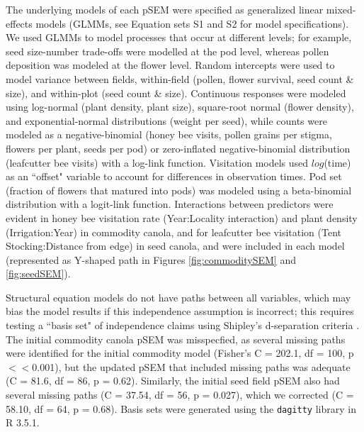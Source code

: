 \documentclass[12pt]{article} %
\begin{document}
The underlying models of each pSEM were specified as generalized linear mixed-effects models (GLMMs, see Equation sets S1 and S2 for model specifications).
We used GLMMs to model processes that occur at different levels; for example, seed size-number trade-offs were modelled at the pod level, whereas pollen deposition was modeled at the flower level.
Random intercepts were used to model variance between fields, within-field (pollen, flower survival, seed count \& size), and within-plot (seed count \& size).
Continuous responses were modeled using log-normal (plant density, plant size), square-root normal (flower density), and exponential-normal distributions (weight per seed), while counts were modeled as a negative-binomial (honey bee visits, pollen grains per stigma, flowers per plant, seeds per pod) or zero-inflated negative-binomial distribution (leafcutter bee visits) with a log-link function.
Visitation models used $log$(time) as an ``offset" variable to account for differences in observation times.
Pod set (fraction of flowers that matured into pods) was modeled using a beta-binomial distribution with a logit-link function.
Interactions between predictors were evident in honey bee visitation rate (Year:Locality interaction) and plant density (Irrigation:Year) in commodity canola, and for leafcutter bee visitation (Tent Stocking:Distance from edge) in seed canola, and were included in each model (represented as Y-shaped path in Figures \ref{fig:commoditySEM} and \ref{fig:seedSEM}). 

Structural equation models do not have paths between all variables, which may bias the model results if this independence assumption is incorrect; this requires testing a ``basis set" of independence claims using Shipley's d-separation criteria \citep{shipley2000, shipley2009}.
The initial commodity canola pSEM was misspecfied, as several missing paths were identified for the initial commodity model (Fisher's C = 202.1, df = 100, p$<<$0.001), but the updated pSEM that included missing paths was adequate (C = 81.6, df = 86, p = 0.62).
Similarly, the initial seed field pSEM also had several missing paths (C = 37.54, df = 56, p = 0.027), which we corrected (C = 58.10, df = 64, p = 0.68).
Basis sets were generated using the \texttt{dagitty} library in R 3.5.1.

\end{document}
